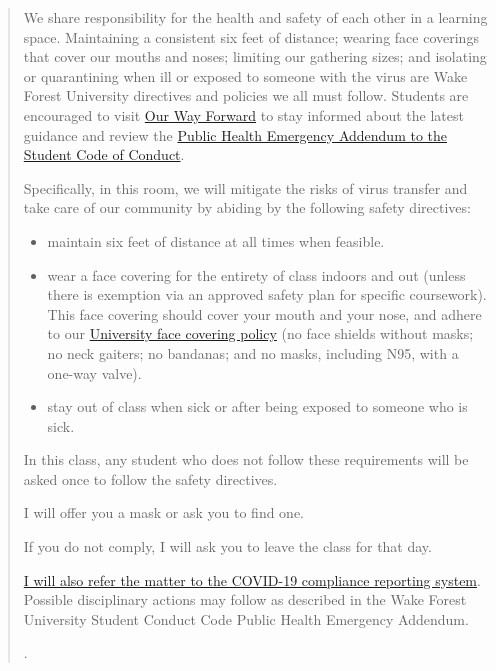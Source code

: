 \begin{quote}
We share responsibility for the health and safety of each other in a learning space. Maintaining a consistent six feet of distance; wearing face coverings that cover our mouths and noses; limiting our gathering sizes; and isolating or quarantining when ill or exposed to someone with the virus are Wake Forest University directives and policies we all must follow. Students are encouraged to visit \href{https://ourwayforward.wfu.edu/}{Our Way Forward} to stay informed about the latest guidance and review the \href{https://studentconduct.wfu.edu/undergraduate-student-handbook/public-health-emergency-addendum/}{Public Health Emergency Addendum to the Student Code of Conduct}.

Specifically, in this room, we will mitigate the risks of virus transfer and take care of our community by abiding by the following safety directives:

\begin{itemize}
\item
  maintain six feet of distance at all times when feasible.
\item
  wear a face covering for the entirety of class indoors and out (unless there is exemption via an approved safety plan for specific coursework). This face covering should cover your mouth and your nose, and adhere to our \href{https://drive.google.com/file/d/1Tqo-by1sjmc-kWUTwAqeNdaHq8OBsU9B/view}{University face covering policy} (no face shields without masks; no neck gaiters; no bandanas; and no masks, including N95, with a one-way valve).
\item
  stay out of class when sick or after being exposed to someone who is sick.
\end{itemize}

In this class, any student who does not follow these requirements will be asked once to follow the safety directives.

I will offer you a mask or ask you to find one.

If you do not comply, I will ask you to leave the class for that day.

\href{https://cm.maxient.com/reportingform.php?WakeForestUniv\&layout_id=40}{I will also refer the matter to the COVID-19 compliance reporting system}. Possible disciplinary actions may follow as described in the Wake Forest University Student Conduct Code Public Health Emergency Addendum.

.
\end{quote}

